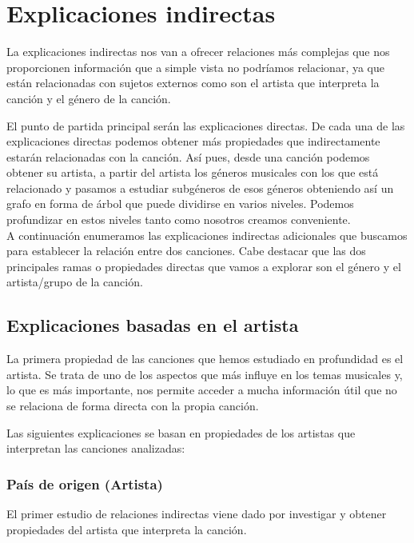 \section{Explicaciones indirectas}

La explicaciones indirectas nos van a ofrecer relaciones más complejas que nos proporcionen información que a simple vista no podríamos relacionar, ya que están relacionadas con sujetos externos como son el artista que interpreta la canción y el género de la canción.

El punto de partida principal serán las explicaciones directas. De cada una de las explicaciones directas podemos obtener más propiedades que indirectamente estarán relacionadas con la canción. Así pues, desde una canción podemos obtener su artista, a partir del artista los géneros musicales con los que está relacionado y pasamos a estudiar subgéneros de esos géneros obteniendo así un grafo en forma de árbol que puede dividirse en varios niveles. Podemos profundizar en estos niveles tanto como nosotros creamos conveniente. \\

A continuación enumeramos las explicaciones indirectas adicionales que buscamos para establecer la relación entre dos canciones. Cabe destacar que las dos principales ramas o propiedades directas que vamos a explorar son el género y el artista/grupo de la canción.

\subsection{Explicaciones basadas en el artista}

La primera propiedad de las canciones que hemos estudiado en profundidad es el artista. Se trata de uno de los aspectos que más influye en los temas musicales y, lo que es más importante, nos permite acceder a mucha información útil que no se relaciona de forma directa con la propia canción.

Las siguientes explicaciones se basan en propiedades de los artistas que interpretan las canciones analizadas:

\subsubsection*{País de origen (Artista)}

El primer estudio de relaciones indirectas viene dado por investigar y obtener propiedades del artista que interpreta la canción.

